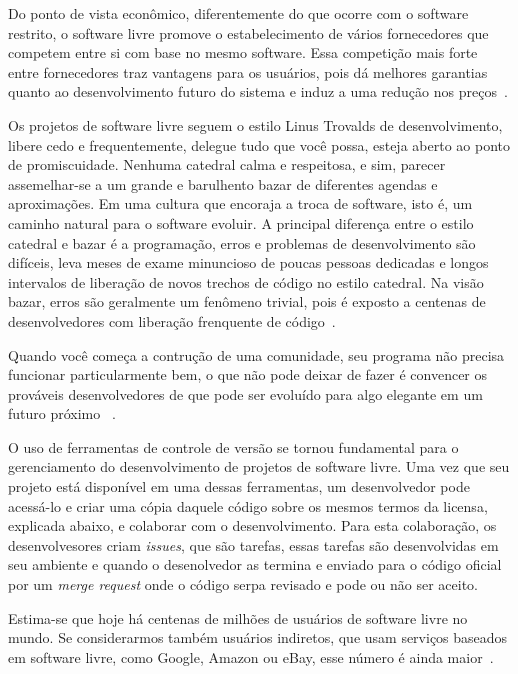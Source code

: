 Do ponto de vista econômico, diferentemente do que ocorre com o software 
restrito, o software livre promove o estabelecimento
de vários fornecedores que competem entre si com base no mesmo software. Essa competição 
mais forte entre fornecedores traz vantagens para os usuários, pois dá melhores
garantias quanto ao desenvolvimento futuro do sistema e induz a uma redução nos 
preços~\cite{kon2012software}.

Os projetos de software livre seguem o estilo Linus Trovalds de desenvolvimento, libere
cedo e frequentemente, delegue tudo que você possa, esteja aberto ao ponto de promiscuidade.
Nenhuma catedral calma e respeitosa, e sim, parecer assemelhar-se a um grande e barulhento 
bazar de diferentes agendas e aproximações. Em uma cultura que encoraja a troca de
software, isto é, um caminho natural para o software evoluir. A principal diferença 
entre o estilo catedral e bazar é a programação, erros e problemas de desenvolvimento 
são difíceis, leva meses de exame minuncioso de poucas pessoas dedicadas e longos 
intervalos de liberação de novos trechos de código no estilo catedral. Na visão 
bazar, erros são geralmente um fenômeno trivial, pois é exposto a centenas de 
desenvolvedores com liberação frenquente de código~\cite{Raymond:1999:CB:580808}.

Quando você começa a contrução de uma comunidade, seu programa não precisa funcionar
particularmente bem, o que não pode deixar de fazer é convencer os prováveis 
desenvolvedores de que pode ser evoluído para algo elegante em um futuro próximo
~\cite{Raymond:1999:CB:580808}.

O uso de ferramentas de controle de versão se tornou fundamental para o gerenciamento
do desenvolvimento de projetos de software livre. Uma vez que seu projeto está 
disponível em uma dessas ferramentas, um desenvolvedor pode acessá-lo e criar
uma cópia daquele código sobre os mesmos termos da licensa, explicada abaixo, e 
colaborar com o desenvolvimento. Para esta colaboração, os desenvolvesores criam
\textit{issues}, que são tarefas, essas tarefas são desenvolvidas em seu ambiente
e quando o desenolvedor as termina e enviado para o código oficial por um 
\textit{merge request} onde o código serpa revisado e pode ou não ser aceito.

Estima-se que hoje há centenas de milhões de usuários de software livre no mundo. Se
considerarmos também usuários indiretos, que usam serviços baseados em software livre,
como Google, Amazon ou eBay, esse número é ainda maior~\cite{sabino2009licenccas}.

